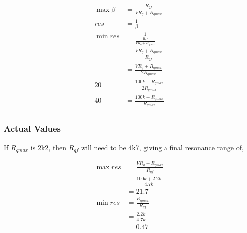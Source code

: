 \documentclass{article}
\begin{document}
\begin{equation*}
\begin{split}
  {\max \beta} & = \frac{R_{qf}}{VR_{q} + R_{qmax}} \\
  res          & = \frac{1}{\beta} \\
  {\min res}   & = \frac{1}{\frac{R_{qf}}{VR_{q} + R_{qmax}}} \\
               & = \frac{VR_{q} + R_{qmax}}{R_{qf}} \\
               & = \frac{VR_{q} + R_{qmax}}{2R_{qmax}} \\
  20           & = \frac{100k + R_{qmax}}{2R_{qmax}} \\
  40           & = \frac{100k + R_{qmax}}{R_{qmax}} \\
\end{split}
\end{equation*}

\subsubsection{Actual Values}

If $R_{qmax}$ is 2k2, then $R_{qf}$ will need to be 4k7, giving a final resonance range of,

\begin{equation*}
\begin{split}
  {\max res} & = \frac{VR_{q} + R_{qmax}}{R_{qf}} \\
             & = \frac{100k + 2.2k}{4.7k} \\
             & = 21.7 \\
  {\min res} & = \frac{R_{qmax}}{R_{qf}} \\
             & = \frac{2.2k}{4.7k} \\
             & = 0.47 \\
\end{split}
\end{equation*}
\end{document}
